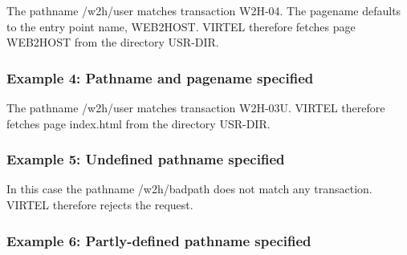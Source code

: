 \documentclass[letterpaper,10pt,english]{sphinxmanual}
\begin{document}
The pathname /w2h/user matches transaction W2H-04. The pagename defaults to the entry point name, WEB2HOST. VIRTEL therefore fetches page WEB2HOST from the directory USR-DIR.


\subsubsection{Example 4: Pathname and pagename specified}
\label{\detokenize{User_Guide:example-4-pathname-and-pagename-specified}}
\begin{sphinxVerbatim}[commandchars=\\\{\}]
\end{sphinxVerbatim}

The pathname /w2h/user matches transaction W2H-03U. VIRTEL therefore fetches page index.html from the directory USR-DIR.

\begin{sphinxVerbatim}[commandchars=\\\{\}]
\end{sphinxVerbatim}


\subsubsection{Example 5: Undefined pathname specified}
\label{\detokenize{User_Guide:example-5-undefined-pathname-specified}}
\begin{sphinxVerbatim}[commandchars=\\\{\}]
\end{sphinxVerbatim}

In this case the pathname /w2h/badpath does not match any transaction. VIRTEL therefore rejects the request.


\subsubsection{Example 6: Partly-defined pathname specified}
\label{\detokenize{User_Guide:example-6-partly-defined-pathname-specified}}
\begin{sphinxVerbatim}[commandchars=\\\{\}]
\end{sphinxVerbatim}
\end{document}
